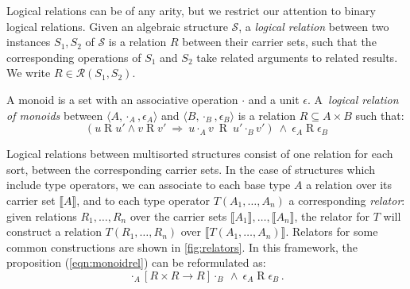 \documentclass[sigplan,10pt,review]{acmart}
\newcommand{\ifr}[1]{\mathrel{[{#1}]}}
\begin{document}
Logical relations can be of any arity,
but
we restrict our attention to
binary logical relations.
Given an algebraic structure $\mathcal{S}$,
a \emph{logical relation}
between two instances $S_1, S_2$ of $\mathcal{S}$
is a relation $R$
between their carrier sets,
such that the corresponding operations of $S_1$ and $S_2$
take related arguments to related results.
We write $R \in \mathcal{R}(S_1, S_2)$.

\begin{example}%
\label{ex:monoid}
A monoid is a set with
an associative operation $\cdot$ and
a unit $\epsilon$.
A~\emph{logical relation of monoids} between
$\langle A, \cdot_A, \epsilon_A \rangle$ and
$\langle B, \cdot_B, \epsilon_B \rangle$
is a relation $R \subseteq A \times B$
such that:
\begin{equation}
\label{eqn:monoidrel}
(u \mathrel{R} u' \wedge v \mathrel{R} v' \: \Rightarrow \:
 u \cdot_A v \: \mathrel{R} \: u' \cdot_B v')
\: \wedge \:
\epsilon_A \mathrel{R} \epsilon_B
\end{equation}
\end{example}

Logical relations between multisorted structures
consist of one relation for each sort,
between the corresponding carrier sets.
In the case of structures which include type operators,
we can associate to each base type $A$
a relation over its carrier set $\llbracket A \rrbracket$,
and to each type operator $T(A_1, \ldots, A_n)$
a corresponding \emph{relator}:
given relations $R_1, \ldots, R_n$ over
the carrier sets $\llbracket A_1 \rrbracket, \ldots, \llbracket A_n \rrbracket$,
the relator for $T$
will construct a relation $T(R_1, \ldots, R_n)$
over $\llbracket T(A_1, \ldots, A_n) \rrbracket$.
Relators for some common constructions are shown in \autoref{fig:relators}.
In this framework, the proposition (\ref{eqn:monoidrel}) can be reformulated as:
\[
  \cdot_A \ifr{R \times R \rightarrow R} \cdot_B
  \: \wedge \:
  \epsilon_A \mathrel{R} \epsilon_B \,.
\]
\end{document}

